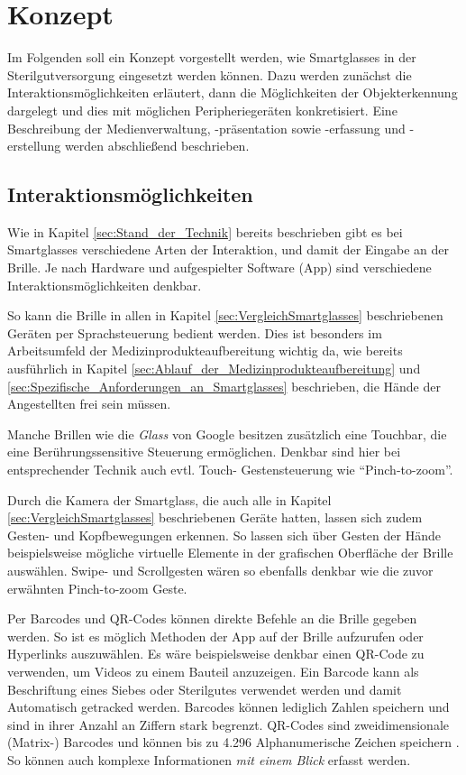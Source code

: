 \chapter{Konzept}
Im Folgenden soll ein Konzept vorgestellt werden, wie Smartglasses in der Sterilgutversorgung eingesetzt werden können. Dazu werden zunächst die Interaktionsmöglichkeiten erläutert, dann die Möglichkeiten der Objekterkennung dargelegt und dies mit möglichen Peripheriegeräten konkretisiert. Eine Beschreibung der Medienverwaltung, -präsentation sowie -erfassung und -erstellung werden abschließend beschrieben.
%
%
\section{Interaktionsmöglichkeiten}
Wie in Kapitel \ref{sec:Stand_der_Technik} bereits beschrieben gibt es bei Smartglasses verschiedene Arten der Interaktion, und damit der Eingabe an der Brille. Je nach Hardware und aufgespielter Software (App) sind verschiedene Interaktionsmöglichkeiten denkbar. 

So kann die Brille in allen in Kapitel \ref{sec:VergleichSmartglasses} beschriebenen Geräten per Sprachsteuerung bedient werden. Dies ist besonders im Arbeitsumfeld der Medizinprodukteaufbereitung wichtig da, wie bereits ausführlich in Kapitel \ref{sec:Ablauf_der_Medizinprodukteaufbereitung} und \ref{sec:Spezifische_Anforderungen_an_Smartglasses} beschrieben, die Hände der Angestellten frei sein müssen.

Manche Brillen wie die \emph{Glass} von Google besitzen zusätzlich eine Touchbar, die eine Berührungssensitive Steuerung ermöglichen. Denkbar sind hier bei entsprechender Technik auch evtl. Touch- Gestensteuerung wie \enquote{Pinch-to-zoom}.

Durch die Kamera der Smartglass, die auch alle in Kapitel \ref{sec:VergleichSmartglasses} beschriebenen Geräte hatten, lassen sich zudem Gesten- und Kopfbewegungen erkennen. So lassen sich über Gesten der Hände beispielsweise mögliche virtuelle Elemente in der grafischen Oberfläche der Brille auswählen. Swipe- und Scrollgesten wären so ebenfalls denkbar wie die zuvor erwähnten Pinch-to-zoom Geste.

Per Barcodes und QR-Codes können direkte Befehle an die Brille gegeben werden. So ist es möglich Methoden der App auf der Brille aufzurufen oder Hyperlinks auszuwählen. Es wäre beispielsweise denkbar einen QR-Code zu verwenden, um Videos zu einem Bauteil anzuzeigen. Ein Barcode kann als Beschriftung eines Siebes oder Sterilgutes verwendet werden und damit Automatisch getracked werden. Barcodes können lediglich Zahlen speichern und sind in ihrer Anzahl an Ziffern stark begrenzt. QR-Codes sind zweidimensionale (Matrix-) Barcodes  und können bis zu 4.296 Alphanumerische Zeichen speichern \cite{INCORPORATED2018}. So können auch komplexe Informationen \emph{mit einem Blick} erfasst werden.

